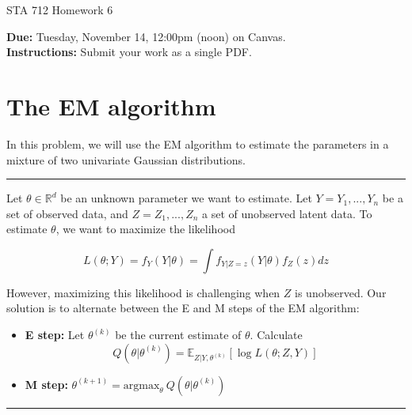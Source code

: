 \documentclass[11pt]{article}
\begin{document}
\begin{center}
\Large
STA 712 Homework 6\\
\normalsize
\vspace{5mm}
\end{center}

\noindent \textbf{Due:} Tuesday, November 14, 12:00pm (noon) on Canvas.\\ 

\noindent \textbf{Instructions:} Submit your work as a single PDF. 

\section*{The EM algorithm}

In this problem, we will use the EM algorithm to estimate the parameters in a mixture of two univariate Gaussian distributions.\\

\noindent \rule{\textwidth}{1pt}


\noindent Let $\theta \in \mathbb{R}^d$ be an unknown parameter we want to estimate. Let $Y = Y_1,...,Y_n$ be a set of observed data, and $Z = Z_1,...,Z_n$ a set of unobserved latent data. To estimate $\theta$, we want to maximize the likelihood

$$L(\theta; Y) = f_Y(Y|\theta) = \int f_{Y|Z=z}(Y|\theta) f_Z(z) dz$$

\noindent However, maximizing this likelihood is challenging when $Z$ is unobserved. Our solution is to alternate between the E and M steps of the EM algorithm:

\begin{itemize}
\item[]\textbf{E step:} Let $\theta^{(k)}$ be the current estimate of $\theta$. Calculate
$$Q(\theta | \theta^{(k)}) = \mathbb{E}_{Z|Y, \theta^{(k)}} [\log L(\theta; Z, Y)]$$

\item[] \textbf{M step:} $\theta^{(k+1)} = \text{argmax}_\theta \ Q(\theta | \theta^{(k)})$
\end{itemize}

\noindent \rule{\textwidth}{1pt}
\end{document}
